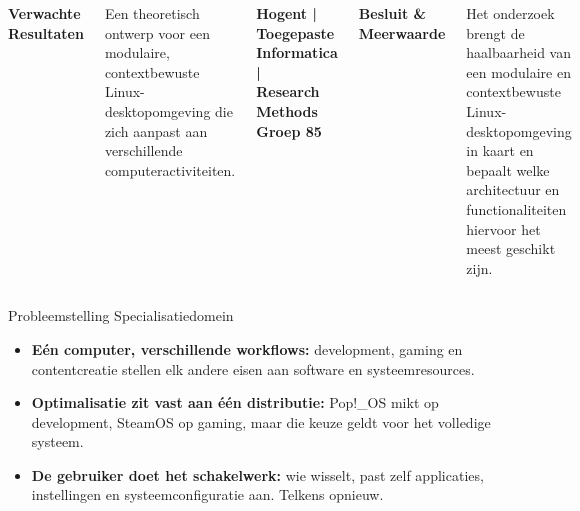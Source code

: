 \documentclass[aspectratio=169]{beamer}
\begin{document}
\begin{frame}[t]
\begin{columns}[t,onlytextwidth]
        \begin{tcolorbox}[columntitle, height=1.1cm]
            \textbf{Verwachte \\ Resultaten}
        \end{tcolorbox}
        \begin{tcolorbox}[columntext]
            \tiny Een theoretisch ontwerp voor een modulaire, contextbewuste Linux-desktopomgeving die zich aanpast aan verschillende computeractiviteiten.
        \end{tcolorbox}
        \begin{tcolorbox}[columntext, colback=white, colframe=white, boxrule=0pt, boxsep=0pt, left=0pt, right=0pt, bottom=0pt]
            \tiny \textbf{\textcolor{colorsix}{
                    Hogent | Toegepaste Informatica | \\Research Methods Groep 85
            }}
        \end{tcolorbox}
        \begin{tcolorbox}[columntitle, height=1.1cm]
            \textbf{Besluit \& \\ Meerwaarde}
        \end{tcolorbox}
        \begin{tcolorbox}[columntext]
            \tiny Het onderzoek brengt de haalbaarheid van een modulaire en contextbewuste Linux-desktopomgeving in kaart en bepaalt welke architectuur en functionaliteiten hiervoor het meest geschikt zijn.
        \end{tcolorbox}
    \end{columns}   
\end{frame}

\begin{frame}{Probleemstelling Specialisatiedomein}
    
    \vspace{-5pt}
    
    \begin{tcolorbox}[colback=colortwo, colframe=colorsix, width=.8\textwidth]
        \begin{itemize}[label=\textcolor{colorsix}{$\blacktriangleright$}]
            \item \textcolor{colorsix}{\textbf{Eén computer, verschillende workflows:} development, gaming en contentcreatie stellen elk andere eisen aan software en systeemresources.}
            \item \textcolor{colorsix}{\textbf{Optimalisatie zit vast aan één distributie:} Pop!\_OS mikt op development, SteamOS op gaming, maar die keuze geldt voor het volledige systeem.}
            \item \textcolor{colorsix}{\textbf{De gebruiker doet het schakelwerk:} wie wisselt, past zelf applicaties, instellingen en systeemconfiguratie aan. Telkens opnieuw.}
        \end{itemize}
    \end{tcolorbox}
    
\end{frame}
\end{document}
